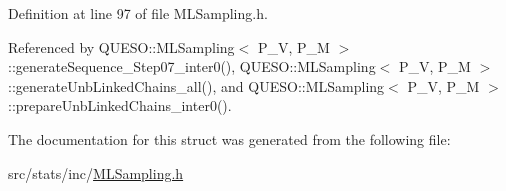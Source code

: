 Definition at line 97 of file M\-L\-Sampling.\-h.



Referenced by Q\-U\-E\-S\-O\-::\-M\-L\-Sampling$<$ P\-\_\-\-V, P\-\_\-\-M $>$\-::generate\-Sequence\-\_\-\-Step07\-\_\-inter0(), Q\-U\-E\-S\-O\-::\-M\-L\-Sampling$<$ P\-\_\-\-V, P\-\_\-\-M $>$\-::generate\-Unb\-Linked\-Chains\-\_\-all(), and Q\-U\-E\-S\-O\-::\-M\-L\-Sampling$<$ P\-\_\-\-V, P\-\_\-\-M $>$\-::prepare\-Unb\-Linked\-Chains\-\_\-inter0().



The documentation for this struct was generated from the following file\-:\begin{DoxyCompactItemize}
\item 
src/stats/inc/\hyperlink{_m_l_sampling_8h}{M\-L\-Sampling.\-h}\end{DoxyCompactItemize}
